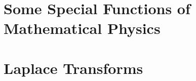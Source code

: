\documentclass[12pt,a4paper]{article}
\begin{document}
\section{Some Special Functions of Mathematical Physics}








































\section{Laplace Transforms}
\end{document}
